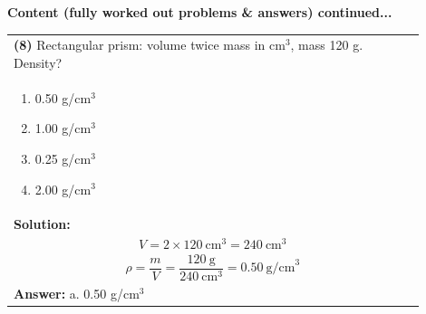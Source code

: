 \documentclass{article}
\begin{document}
{\newpage
\noindent
{\large\textbf{Content (fully worked out problems \& answers) continued...}}\\[0.2em]
\vspace{0.2cm}
\begin{tabular}{|p{0.9\linewidth}|}
\hline
\vspace{0.2cm}
\textbf{(8)} Rectangular prism: volume twice mass in cm$^3$, mass 120 g. Density? \\
\begin{minipage}[t]{0.85\linewidth}
\begin{enumerate}[label=\alph*.]
   \item 0.50 g/cm$^3$
   \item 1.00 g/cm$^3$
   \item 0.25 g/cm$^3$
   \item 2.00 g/cm$^3$
\end{enumerate}
\end{minipage}\\
\hline
\vspace{0.2cm}
\textbf{Solution:} \\
\[
V = 2 \times 120~\text{cm}^3 = 240~\text{cm}^3 
\] \\
\[
\rho = \frac{m}{V} = \frac{120~\text{g}}{240~\text{cm}^3} = 0.50~\text{g/cm}^3
\] \\ 
\hline
\vspace{0.2cm}
\textbf{Answer:} a. 0.50 g/cm$^3$ \\
\hline
\end{tabular}

}
\end{document}
